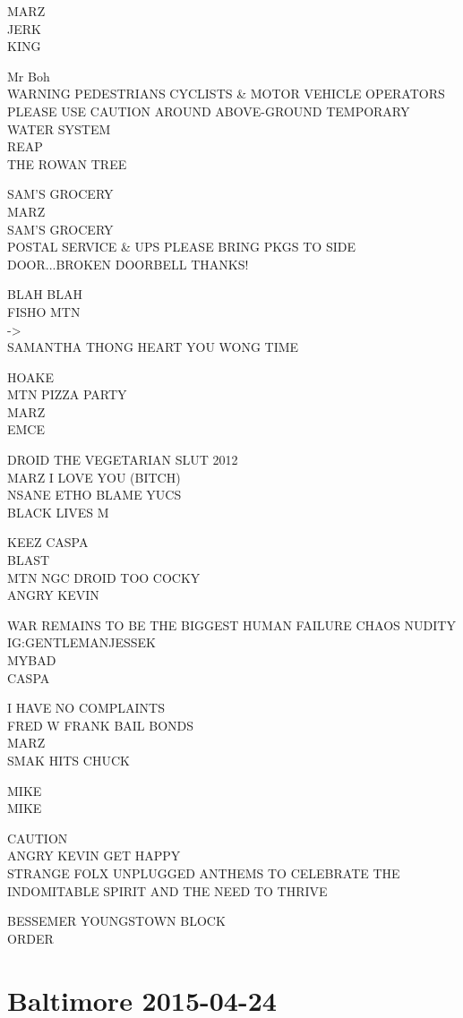 \documentclass[10pt,letterpaper]{article}
\begin{document}
MARZ\\
JERK\\
KING

Mr Boh\\
WARNING PEDESTRIANS CYCLISTS \& MOTOR VEHICLE OPERATORS PLEASE USE CAUTION AROUND ABOVE{-}GROUND TEMPORARY WATER SYSTEM\\
REAP\\
THE ROWAN TREE

SAM'S GROCERY\\
MARZ\\
SAM'S GROCERY\\
POSTAL SERVICE \& UPS PLEASE BRING PKGS TO SIDE DOOR...BROKEN DOORBELL THANKS!

BLAH BLAH\\
FISHO MTN\\
{-}>\\
SAMANTHA THONG HEART YOU WONG TIME

HOAKE\\
MTN PIZZA PARTY\\
MARZ\\
EMCE

DROID THE VEGETARIAN SLUT 2012\\
MARZ I LOVE YOU (BITCH)\\
NSANE ETHO BLAME YUCS\\
BLACK LIVES M

KEEZ CASPA\\
BLAST\\
MTN NGC DROID TOO COCKY\\
ANGRY KEVIN

WAR REMAINS TO BE THE BIGGEST HUMAN FAILURE CHAOS NUDITY\\
IG:GENTLEMANJESSEK\\
MYBAD\\
CASPA

I HAVE NO COMPLAINTS\\
FRED W FRANK BAIL BONDS\\
MARZ\\
SMAK HITS CHUCK

MIKE\\
MIKE

CAUTION\\
ANGRY KEVIN GET HAPPY\\
STRANGE FOLX UNPLUGGED ANTHEMS TO CELEBRATE THE INDOMITABLE SPIRIT AND THE NEED TO THRIVE

BESSEMER YOUNGSTOWN BLOCK\\
ORDER
\

\section*{Baltimore 2015-04-24}
\end{document}
